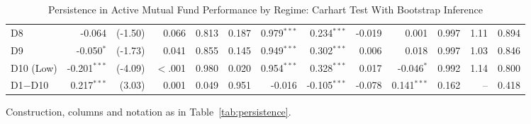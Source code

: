 \begin{table}[!htbp]
{\begin{tabular*}{\linewidth}{@{\extracolsep{\fill}}lrrrrrrrrrrrr}
\hspace{1em}D8 & -0.064 & (-1.50) & 0.066 & 0.813 & 0.187 & 0.979$^{***}$ & 0.234$^{***}$ & -0.019 & 0.001 & 0.997 & 1.11 & 0.894\\
\hspace{1em}D9 & -0.050$^{*}$ & (-1.73) & 0.041 & 0.855 & 0.145 & 0.949$^{***}$ & 0.302$^{***}$ & 0.006 & 0.018 & 0.997 & 1.03 & 0.846\\
\hspace{1em}D10 (Low) & -0.201$^{***}$ & (-4.09) & $<$.001 & 0.980 & 0.020 & 0.954$^{***}$ & 0.328$^{***}$ & 0.017 & -0.046$^{*}$ & 0.992 & 1.14 & 0.800\\
\hspace{1em}D1$-$D10 & 0.217$^{***}$ & (3.03) & 0.001 & 0.049 & 0.951 & -0.016 & -0.105$^{***}$ & -0.078 & 0.141$^{***}$ & 0.162 & -- & 0.418\\
\bottomrule
\end{tabular*}%
}\sbefit
\fi
\setlength{\tabletempwidth}{\wd\tabletempbox}
\ifdim\tabletempwidth>\linewidth\setlength{\tabletempwidth}{\linewidth}\fi
\begin{minipage}{\tabletempwidth}
\captionsetup{width=\linewidth}
\caption{Persistence in Active Mutual Fund Performance by Regime: Carhart Test With Bootstrap Inference}\label{tab:persistence_regime}
\ifdim\wd\tabletempbox>\linewidth
  \resizebox{\linewidth}{!}{\usebox{\tabletempbox}}
\else
  \usebox{\tabletempbox}
\fi
\par\medskip
\begin{singlespace}\tablefont\noindent
Construction, columns and notation as in Table~\ref{tab:persistence}.
\end{singlespace}
\end{minipage}
\end{table}

